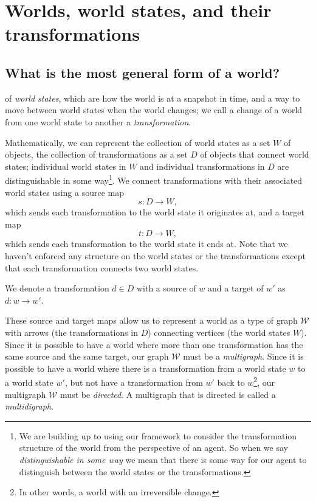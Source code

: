 \section{Worlds, world states, and their transformations}\label{sec:A mathematical treatment of worlds and their transformations}

\subsection{What is the most general form of a world?}
 of \emph{world states}, which are how the world is at a snapshot in time, and a way to move between world states when the world changes; we call a change of a world from one world state to another a \emph{transformation}.

Mathematically, we can represent the collection of world states as a set $W$ of objects, the collection of transformations as a set $D$ of objects that connect world states; individual world states in $W$ and individual transformations in $D$ are distinguishable in some way\footnote{
We are building up to using our framework to consider the transformation structure of the world from the perspective of an agent. So when we say \emph{distinguishable in some way} we mean that there is some way for our agent to distinguish between the world states or the transformations.
}.
We connect transformations with their associated world states using a source map
\begin{equation}
	s: D \to W,
\end{equation}
which sends each transformation to the world state it originates at, and a target map
\begin{equation}
	t: D \to W,
\end{equation}
which sends each transformation to the world state it ends at.
Note that we haven't enforced any structure on the world states or the transformations except that each transformation connects two world states.

\begin{definition}
	We denote a transformation $d \in D$ with a source of $w$ and a target of $w'$ as $d: w \to w'$.
\end{definition}

These source and target maps allow us to represent a world as a type of graph $\mathscr{W}$ with arrows (the transformations in $D$) connecting vertices (the world states $W$).
Since it is possible to have a world where more than one transformation has the same source and the same target, our graph $\mathscr{W}$ must be a \emph{multigraph}.
Since it is possible to have a world where there is a transformation from a world state $w$ to a world state $w'$, but not have a transformation from $w'$ back to $w$\footnote{In other words, a world with an irreversible change.}, our multigraph $\mathscr{W}$ must be \emph{directed}.
A multigraph that is directed is called a \emph{multidigraph}.

